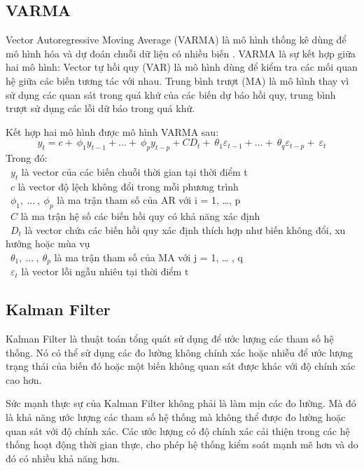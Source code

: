 \subsection{VARMA}
Vector Autoregressive Moving Average (VARMA) là mô hình thống kê dùng để mô hình hóa và dự đoán chuỗi dữ liệu có nhiều biến . VARMA là sự kết hợp giữa hai mô hình: Vector tự hồi quy (VAR) là mô hình dùng để kiểm tra các mối quan hệ giữa các biến tương tác với nhau. Trung bình trượt (MA) là mô hình thay vì sử dụng các quan sát trong quá khứ của các biến dự báo hồi quy, trung bình trượt sử dụng các lỗi dữ báo trong quá khứ. 
\par
Kết hợp hai mô hình được mô hình VARMA sau:
\[y_{t} = c + \ \phi_{1}y_{t - 1} + \ldots + \ \phi_{p}y_{t - p} + CD_{t} + \ \theta_{1}\varepsilon_{t - 1} + \ldots + \ \theta_{q}\varepsilon_{t - p} + \ \varepsilon_{t}\]
Trong đó:\\
    \indent\textbullet\ \(y_{t}\) là vector của các biến chuỗi thời gian tại thời điểm t\\
    \indent\textbullet\ \(c\) là vector độ lệch không đổi trong mỗi phương trình\\
    \indent\textbullet\ \(\phi_{1},\ \ldots\ ,\ \phi_{p}\) là ma trận tham số của AR với i = 1, …, p\\
    \indent\textbullet\ \(C\) là ma trận hệ số các biến hồi quy có khả năng xác định\\
    \indent\textbullet\ \(D_{t}\) là vector chứa các biến hồi quy xác định thích hợp như biến không đổi, xu hướng hoặc mùa vụ\\
    \indent\textbullet\ \(\theta_{1},\ \ldots\ ,\ \theta_{p}\) là ma trận tham số của MA với j = 1, … , q\\
    \indent\textbullet\ \(\varepsilon_{t}\) là vector lỗi ngẫu nhiêu tại thời điểm t\\

\subsection{Kalman Filter}
Kalman Filter là thuật toán tổng quát sử dụng để ước lượng các tham số hệ thống. Nó có thể sử dụng các đo lường không chính xác hoặc nhiễu để ước lượng trạng thái của biến đó hoặc một biến không quan sát được khác với độ chính xác cao hơn.
\par
Sức mạnh thực sự của Kalman Filter không phải là làm mịn các đo lường. Mà đó là khả năng ước lượng các tham số hệ thống mà không thể được đo lường hoặc quan sát với độ chính xác. Các ước lượng có độ chính xác cải thiện trong các hệ thống hoạt động thời gian thực, cho phép hệ thống kiểm soát mạnh mẽ hơn và do đó có nhiều khả năng hơn.

